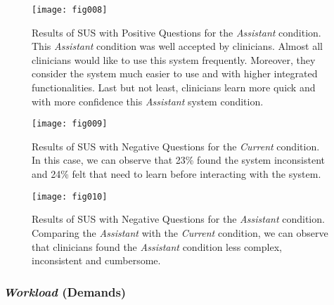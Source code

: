 \begin{figure}[htbp]
\centering
\texttt{[image: fig008]}
\caption{Results of SUS with Positive Questions for the {\it Assistant} condition. This {\it Assistant} condition was well accepted by clinicians. Almost all clinicians would like to use this system frequently. Moreover, they consider the system much easier to use and with higher integrated functionalities. Last but not least, clinicians learn more quick and with more confidence this {\it Assistant} system condition.}
\label{fig:fig008}
\end{figure}

\begin{figure}[htbp]
\centering
\texttt{[image: fig009]}
\caption{Results of SUS with Negative Questions for the {\it Current} condition. In this case, we can observe that 23\% found the system inconsistent and 24\% felt that need to learn before interacting with the system.}
\label{fig:fig009}
\end{figure}

\begin{figure}[htbp]
\centering
\texttt{[image: fig010]}
\caption{Results of SUS with Negative Questions for the {\it Assistant} condition. Comparing the {\it Assistant} with the {\it Current} condition, we can observe that clinicians found the {\it Assistant} condition less complex, inconsistent and cumbersome.}
\label{fig:fig010}
\end{figure}



\subsubsection{{\it Workload} (Demands)}

